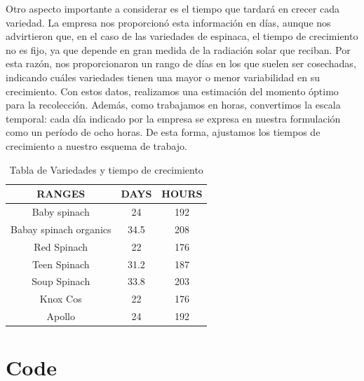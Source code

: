 Otro aspecto importante a considerar es el tiempo que tardará en crecer cada variedad. La empresa nos proporcionó esta 
información en días, aunque nos advirtieron que, en el caso de las variedades de espinaca, el tiempo de crecimiento no es fijo,
 ya que depende en gran medida de la radiación solar que reciban. Por esta razón, nos proporcionaron un rango de días en los que 
 suelen ser cosechadas, indicando cuáles variedades tienen una mayor o menor variabilidad en su crecimiento. Con estos datos, 
 realizamos una estimación del momento óptimo para la recolección. Además, como trabajamos en horas, convertimos la escala temporal:
 cada día indicado por la empresa se expresa en nuestra formulación como un período de ocho horas. De esta forma, ajustamos los tiempos 
 de crecimiento a nuestro esquema de trabajo.
\begin{table}[ht!]
    \centering
    \begin{minipage}{0.48\textwidth}
        \centering
        \begin{tabular}{|c|c|c|}
            \hline
            \rowcolor{gray!30} \textbf{\textcolor{grey3}{RANGES}} & \textbf{\textcolor{grey3}{DAYS}} &  \textbf{\textcolor{grey3}{HOURS}}\\ 
            \hline
            Baby spinach   & 24 & 192 \\ \hline
            Babay spinach organics  & 34.5 & 208\\ \hline
            Red Spinach              & 22 & 176\\ \hline
            Teen Spinach           & 31.2 & 187\\ \hline
            Soup Spinach & 33.8 & 203 \\ \hline
            Knox Cos     & 22 & 176 \\ \hline
            Apollo      & 24 & 192 \\ \hline
             
            \hline
        \end{tabular}
        \caption{Tabla de Variedades y tiempo de crecimiento}
        \label{tab:Variedades}
    \end{minipage}
    \hfill
\end{table}
\chapter*{Code}

